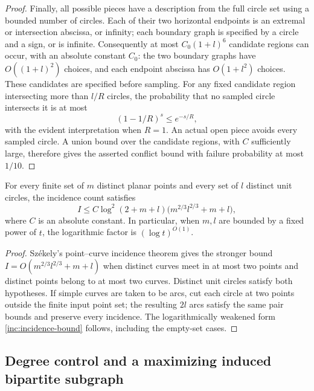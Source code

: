 \begin{proof}
Finally, all possible pieces have a description from the full circle
set using a bounded number of circles. Each of their two horizontal
endpoints is an extremal or intersection abscissa, or infinity; each
boundary graph is specified by a circle and a sign, or is infinite.
Consequently at most \(C_0(1+l)^6\) candidate regions can occur, with
an absolute constant \(C_0\): the two boundary graphs have
\(O((1+l)^2)\) choices, and each endpoint abscissa has
\(O(1+l^2)\) choices. These candidates are specified before sampling.
For any fixed candidate region intersecting
more than \(l/R\) circles, the probability that no sampled circle
intersects it is at most
\[
 (1-1/R)^s\le e^{-s/R},
\]
with the evident interpretation when \(R=1\). An actual open piece
avoids every sampled circle. A union bound over the candidate regions,
with \(C\) sufficiently large, therefore gives the asserted conflict
bound with failure probability at most \(1/10\).
\end{proof}

\begin{proposition}\label{inc:incidence}
For every finite set of \(m\) distinct planar points and every set of
\(l\) distinct unit circles, the incidence count satisfies
\begin{equation}\label{inc:incidence-bound}
 I\le C\log^2(2+m+l)\bigl(m^{2/3}l^{2/3}+m+l\bigr),
\end{equation}
where \(C\) is an absolute constant.
In particular, when \(m,l\) are bounded by a fixed power of \(t\), the logarithmic factor is \((\log t)^{O(1)}\).
\end{proposition}

\begin{proof}
Sz\'ekely's point--curve incidence theorem
\cite[Theorem~8]{Szekely1997} gives the stronger bound \(I=O(m^{2/3}l^{2/3}+m+l)\)
when distinct curves meet in at most two
points and distinct points belong to at most two curves. Distinct unit
circles satisfy both hypotheses. If simple curves are taken to be arcs,
cut each circle at two points outside the finite input point set; the
resulting \(2l\) arcs satisfy the same pair bounds and preserve every
incidence. The logarithmically weakened form \eqref{inc:incidence-bound} follows, including the empty-set cases.
\end{proof}

\subsection{Degree control and a maximizing induced bipartite subgraph}\label{sec:piece-proof}

